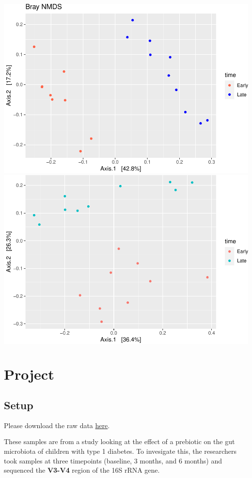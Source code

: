 \documentclass[
]{book}
\begin{document}
\includegraphics{16sworkshop_files/figure-latex/unnamed-chunk-3-1.pdf} \includegraphics{16sworkshop_files/figure-latex/unnamed-chunk-3-2.pdf}

\hypertarget{project}{%
\chapter{Project}\label{project}}

\hypertarget{setup}{%
\section{Setup}\label{setup}}

Please download the raw data \href{https://www.dropbox.com/sh/1oy9upgzxlsra9y/AAANkbCj36lvP6vEQucE7fYna?dl=0}{here}.

These samples are from a study looking at the effect of a prebiotic on the gut microbiota of children with type 1 diabetes. To invesigate this, the researchers took samples at three timepoints (baseline, 3 months, and 6 months) and sequenced the \textbf{V3-V4} region of the 16S rRNA gene.
\end{document}
